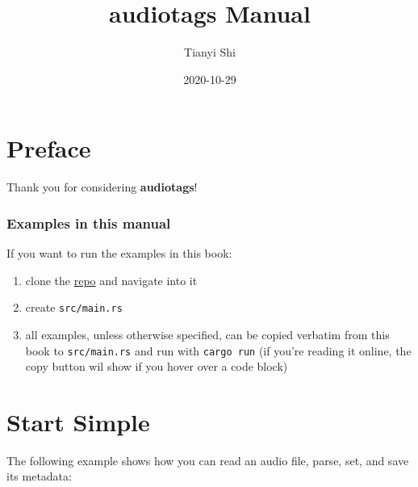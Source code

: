 \documentclass[
]{book}
\title{audiotags Manual}
\author{Tianyi Shi}
\date{2020-10-29}
\providecommand{\tightlist}{%
  \setlength{\itemsep}{0pt}\setlength{\parskip}{0pt}}
\begin{document}
\maketitle

{
\setcounter{tocdepth}{1}
\tableofcontents
}
\hypertarget{preface}{%
\chapter*{Preface}\label{preface}}

Thank you for considering \textbf{audiotags}!

\hypertarget{examples-in-this-manual}{%
\subsection*{Examples in this manual}\label{examples-in-this-manual}}

If you want to run the examples in this book:

\begin{enumerate}
\def\labelenumi{\arabic{enumi}.}
\tightlist
\item
  clone the \href{https://github.com/TianyiShi2001/audiotags}{repo} and navigate into it
\item
  create \texttt{src/main.rs}
\item
  all examples, unless otherwise specified, can be copied verbatim from this book to \texttt{src/main.rs} and run with \texttt{cargo\ run} (if you're reading it online, the copy button wil show if you hover over a code block)
\end{enumerate}

\hypertarget{start-simple}{%
\chapter{Start Simple}\label{start-simple}}

The following example shows how you can read an audio file, parse, set, and save its metadata:
\end{document}
